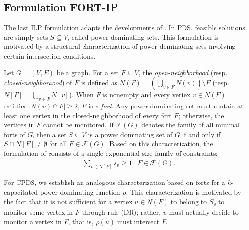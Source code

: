 \documentclass{article}
\newcommand{\FORT}{{\mathscr F}}
\newcommand{\FORTIP}{FORT-IP\xspace}
\begin{document}
 
\subsection{Formulation \FORTIP}

The last ILP formulation adapts the developments of \citet{Bozeman2019}.
In PDS, feasible solutions are simply sets $S \subseteq V$, called power dominating sets.
This formulation is motivated by a structural characterization of power dominating sets involving certain intersection conditions.

Let $G=(V,E)$ be a graph.
For a set $F \subseteq V$, the \emph{open-neighborhood} (resp. \emph{closed-neighborhood}) of $F$ is defined as $N(F) = (\bigcup_{v \in F} N(v)) \setminus F$ (resp. $N[F] = \bigcup_{v \in F} N[v]$).
When $F$ is nonempty and every vertex $v \in N(F)$ satisfies $|N(v) \cap F| \geq 2$, $F$ is a \emph{fort}.
Any power dominating set must contain at least one vertex in the closed-neighborhood of every fort $F$; otherwise, the vertices in $F$ cannot be monitored.
If $\FORT(G)$ denotes the family of all minimal forts of $G$, then
a set $S \subseteq V$ is a power dominating set of $G$ if and only if $S \cap N[F] \neq \emptyset$ for all $F \in \FORT(G)$.
Based on this characterization, the formulation of \citet{Bozeman2019} consists of a single exponential-size family of constraints:
\begin{align}
&\sum_{v \in N[F]} s_v \geq 1 & F \in \FORT(G).
\end{align}

For CPDS, we establish an analogous characterization based on forts for a $k$-capacitated power dominating function $\rho$.
This characterization is motivated by the fact that it is not sufficient for a vertex $u \in N(F)$ to belong to $S_{\rho}$ to monitor some vertex in $F$ through rule (DR); rather, $u$ must actually decide to monitor a vertex in $F$, that is, $\rho(u)$ must intersect $F$.
\end{document}
